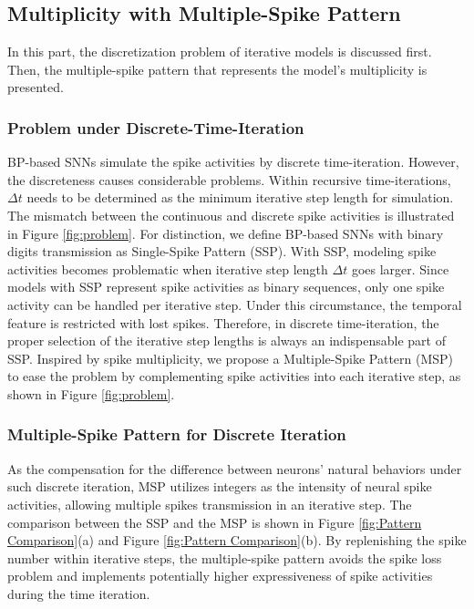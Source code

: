 \documentclass{article}
\begin{document}
\subsection{Multiplicity with Multiple-Spike Pattern}
In this part, the discretization problem of iterative models is discussed first. Then, the multiple-spike pattern that represents the model's multiplicity is presented.



\subsubsection{Problem under Discrete-Time-Iteration}
BP-based SNNs simulate the spike activities by discrete time-iteration. However, the discreteness causes considerable problems. Within recursive time-iterations, $\Delta t$ needs to be determined as the minimum iterative step length for simulation. 
The mismatch between the continuous and discrete spike activities is illustrated in Figure \ref{fig:problem}. 
For distinction, we define BP-based SNNs with binary digits transmission as Single-Spike Pattern (SSP). With SSP, modeling spike activities becomes problematic when iterative step length $\Delta t$ goes larger. 
Since models with SSP represent spike activities as binary sequences, only one spike activity can be handled per iterative step. Under this circumstance, the temporal feature is restricted with lost spikes. Therefore, in discrete time-iteration, the proper selection of the iterative step lengths is always an indispensable part of SSP. Inspired by spike multiplicity, 
we propose a Multiple-Spike Pattern (MSP) to ease the problem by complementing spike activities into each iterative step, as shown in Figure \ref{fig:problem}.














\subsubsection{Multiple-Spike Pattern for Discrete Iteration}







As the compensation for the difference between neurons' natural behaviors under such discrete iteration, MSP utilizes integers as the intensity of neural spike activities, allowing multiple spikes transmission in an iterative step. The comparison between the SSP and the MSP is shown in Figure \ref{fig:Pattern Comparison}(a) and Figure \ref{fig:Pattern Comparison}(b).
By replenishing the spike number within iterative steps, the multiple-spike pattern avoids the spike loss problem and implements potentially higher expressiveness of spike activities during the time iteration.
\end{document}
